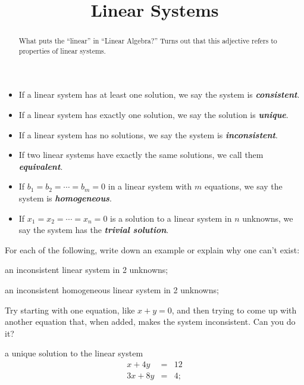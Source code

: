 \documentclass[hidelinks,12pt,handout]{ximera}
\title{Linear Systems}
\newcommand{\defi}[1]{\textbf{\textit{#1}}}
\begin{document}
\begin{abstract}{What puts the ``linear'' in ``Linear Algebra?'' Turns out that this adjective refers to properties of linear systems.}\end{abstract}
\maketitle

\begin{definition}
\begin{itemize}
\item If a linear system has at least one solution, we say the system is \defi{consistent}.
\item If a linear system has exactly one solution, we say the solution is \defi{unique}.
\item If a linear system has no solutions, we say the system is \defi{inconsistent}.
\item If two linear systems have exactly the same solutions, we call them \defi{equivalent}.
\item If $b_1 = b_2 = \cdots = b_m = 0$ in a linear system with $m$ equations, we say the system is \defi{homogeneous}.
\item If $x_1 = x_2 = \cdots = x_n = 0$ is a solution to a linear system in $n$ unknowns, we say the system has the \defi{trivial solution}.
\end{itemize}
\end{definition}

For each of the following, write down an example or explain why one can't exist:
\begin{question}
an inconsistent linear system in 2 unknowns;
\vfill
\end{question}

\begin{question}
an inconsistent homogeneous linear system in 2 unknowns;
\vfill
\begin{hint} Try starting with one equation, like $x+y = 0$, and then trying to come up with another equation that, when added, makes the system inconsistent. Can you do it? \end{hint}
\end{question}

\begin{question}a unique solution to the linear system 
	\begin{eqnarray*} x + 4 y & = & 12 \\
				   3x + 8y &=&  4;
	\end{eqnarray*}
	\vfill
\end{question}
\end{document}
